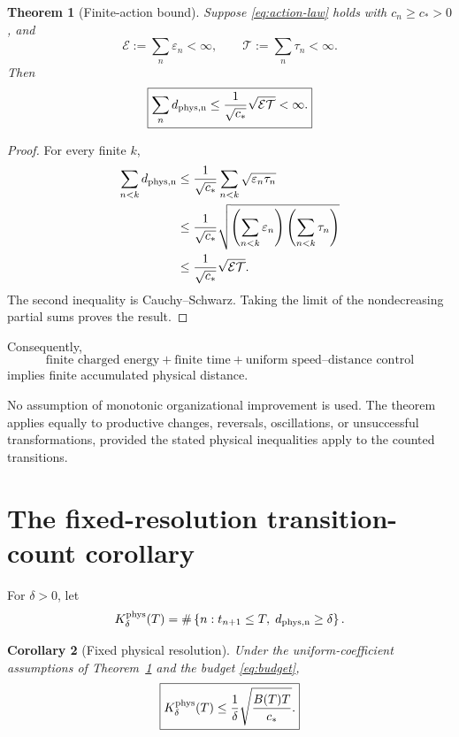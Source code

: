 \documentclass[11pt,a4paper]{article}
\newtheorem{theorem}{Theorem}[section]
\newtheorem{corollary}[theorem]{Corollary}
\theoremstyle{definition}
\numberwithin{equation}{section}
\begin{document}
\begin{theorem}[Finite-action bound]
\label{thm:action}
Suppose \eqref{eq:action-law} holds with
$c_n\ge c_*>0$, and
\[
\mathcal E:=\sum_n\varepsilon_n<\infty,
\qquad
\mathcal T:=\sum_n\tau_n<\infty.
\]
Then
\begin{equation}
\boxed{
\sum_n d_{\rm phys,n}
\le
\frac1{\sqrt{c_*}}\sqrt{\mathcal E\mathcal T}
<\infty.
}
\label{eq:finite-length}
\end{equation}
\end{theorem}

\begin{proof}
For every finite $k$,
\[
\begin{aligned}
\sum_{n<k}d_{\rm phys,n}
&\le
\frac1{\sqrt{c_*}}
\sum_{n<k}\sqrt{\varepsilon_n\tau_n}\\
&\le
\frac1{\sqrt{c_*}}
\sqrt{
\left(\sum_{n<k}\varepsilon_n\right)
\left(\sum_{n<k}\tau_n\right)
}\\
&\le
\frac1{\sqrt{c_*}}\sqrt{\mathcal E\mathcal T}.
\end{aligned}
\]
The second inequality is Cauchy--Schwarz. Taking the limit of the
nondecreasing partial sums proves the result.
\end{proof}

Consequently,
\[
\text{finite charged energy}
+\text{finite time}
+\text{uniform speed--distance control}
\]
implies finite accumulated physical distance.

No assumption of monotonic organizational improvement is used.
The theorem applies equally to productive changes, reversals,
oscillations, or unsuccessful transformations, provided the stated
physical inequalities apply to the counted transitions.


\section{The fixed-resolution transition-count corollary}

For $\delta>0$, let
\[
K_{\delta}^{\rm phys}(T)
=
\#\left\{
n:t_{n+1}\le T,\;
d_{\rm phys,n}\ge\delta
\right\}.
\]

\begin{corollary}[Fixed physical resolution]
\label{cor:physical}
Under the uniform-coefficient assumptions of
Theorem~\ref{thm:action} and the budget \eqref{eq:budget},
\begin{equation}
\boxed{
K_{\delta}^{\rm phys}(T)
\le
\frac1\delta
\sqrt{\frac{B(T)T}{c_*}}.
}
\label{eq:physical-count}
\end{equation}
\end{corollary}
\end{document}
